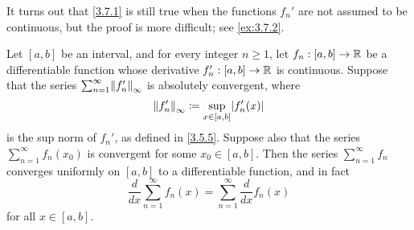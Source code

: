 \begin{rmk}\label{3.7.2}
  It turns out that \cref{3.7.1} is still true when the functions \(f_n'\) are not assumed to be continuous, but the proof is more difficult;
  see \cref{ex:3.7.2}.
\end{rmk}

\begin{cor}\label{3.7.3}
  Let \([a, b]\) be an interval, and for every integer \(n \geq 1\), let \(f_n : [a, b] \to \mathbb{R}\) be a differentiable function whose derivative \(f_n' : [a, b] \to \mathbb{R}\) is continuous.
  Suppose that the series \(\sum_{n = 1}^\infty \norm*{f_n'}_\infty\) is absolutely convergent, where
  \[
    \norm*{f_n'}_\infty \coloneqq \sup_{x \in [a, b]} \abs{f_n'(x)}
  \]
  is the sup norm of \(f_n'\), as defined in \cref{3.5.5}.
  Suppose also that the series \(\sum_{n = 1}^\infty f_n(x_0)\) is convergent for some \(x_0 \in [a, b]\).
  Then the series \(\sum_{n = 1}^\infty f_n\) converges uniformly on \([a, b]\) to a differentiable function, and in fact
  \[
    \dfrac{d}{dx} \sum_{n = 1}^\infty f_n(x) = \sum_{n = 1}^\infty \dfrac{d}{dx} f_n(x)
  \]
  for all \(x \in [a, b]\).
\end{cor}

